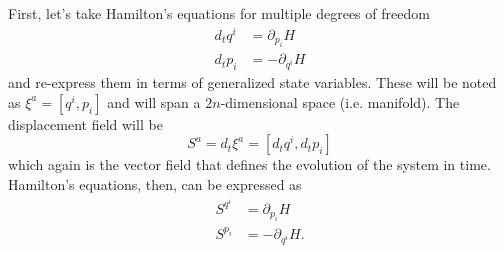 First, let's take Hamilton's equations for multiple degrees of freedom
\begin{equation}\label{rp-cm-hmd-condEquations}
	\tag{HM-ND}
	\begin{aligned}
		d_t q^i &= \partial_{p_i} H \\
		d_t p_i &= - \partial_{q^i} H
	\end{aligned}
\end{equation}
and re-express them in terms of generalized state variables. These will be noted as $\xi^a = [q^i, p_i]$ and will span a $2n$-dimensional space (i.e. manifold). The displacement field will be
\begin{equation}\label{rp-cm-displacementNd}
	S^a = d_t \xi^a = [d_t q^i, d_t p_i]
\end{equation}
which again is the vector field that defines the evolution of the system in time. Hamilton's equations, then, can be expressed as
\begin{equation}
	\begin{aligned}
		S^{q^i} &= \partial_{p_i} H \\
		S^{p_i} &= - \partial_{q^i} H.
	\end{aligned}
\end{equation}

